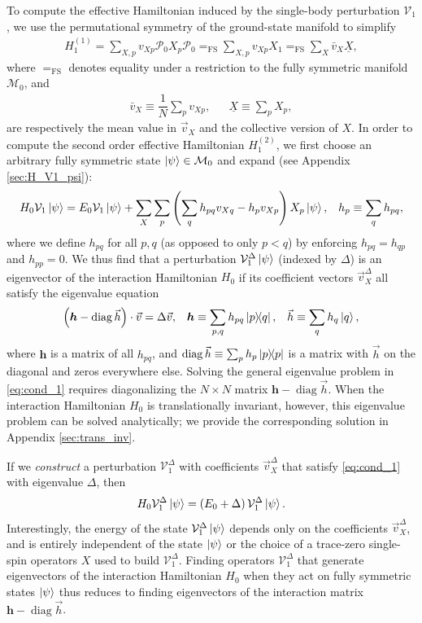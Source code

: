 \documentclass[nofootinbib,notitlepage,11pt]{revtex4-2}
\newcommand{\f}[2]{\dfrac{#1}{#2}} %
\newcommand{\p}[1]{\left(#1\right)} %
\renewcommand{\c}{\cdot} %
\newcommand{\m}{\bm} %
\renewcommand{\v}{\vec} %
\newcommand{\1}{\mathds{1}}
\newcommand{\M}{\mathcal{M}}
\renewcommand{\P}{\mathcal{P}}
\newcommand{\V}{\mathcal{V}}
\newcommand{\EQFS}{=_{\text{FS}}}
\newcommand{\col}{\underline}
\DeclareMathOperator{\diag}{diag}
\begin{document}
To compute the effective Hamiltonian induced by the single-body
perturbation $\V_1$, we use the permutational symmetry of the
ground-state manifold to simplify
\begin{align}
  H_1^{(1)} = \sum_{X,p} v_{Xp} \P_0 X_p \P_0
  \EQFS \sum_{X,p} v_{Xp} X_1
  \EQFS \sum_X \bar v_X \col{X},
  \label{eq:H_1_1}
\end{align}
where $\EQFS$ denotes equality under a restriction to the fully
symmetric manifold $\M_0$, and
\begin{align}
  \bar v_X \equiv \f1N \sum_p v_{Xp},
  &&
  \col{X} \equiv \sum_p X_p,
\end{align}
are respectively the mean value in $\v v_X$ and the collective version
of $X$.  In order to compute the second order effective Hamiltonian
$H_1^{(2)}$, we first choose an arbitrary fully symmetric state
$\ket\psi\in\M_0$ and expand (see Appendix \ref{sec:H_V1_psi}):
\begin{align}
  H_0 \V_1 \ket\psi
  = E_0 \V_1 \ket\psi
  + \sum_X \sum_p \p{\sum_q h_{pq} v_{Xq} - h_p v_{Xp}} X_p
  \ket\psi,
  &&
  h_p \equiv \sum_q h_{pq},
  \label{eq:H_V1_psi}
\end{align}
where we define $h_{pq}$ for all $p,q$ (as opposed to only $p<q$) by
enforcing $h_{pq}=h_{qp}$ and $h_{pp}=0$.  We thus find that a
perturbation $\V_1^\Delta\ket\psi$ (indexed by $\Delta$) is an
eigenvector of the interaction Hamiltonian $H_0$ if its coefficient
vectors $\v v_X^\Delta$ all satisfy the eigenvalue equation
\begin{align}
  \p{\m h - \diag\v h}\c\v v = \Delta \v v,
  &&
  \m h \equiv \sum_{p,q} h_{pq} \op{p}{q},
  &&
  \v h \equiv \sum_q h_q \ket{q},
  \label{eq:cond_1}
\end{align}
where $\m h$ is a matrix of all $h_{pq}$, and
$\diag\v h\equiv\sum_p h_p \op{p}$ is a matrix with $\v h$ on the
diagonal and zeros everywhere else.  Solving the general eigenvalue
problem in \eqref{eq:cond_1} requires diagonalizing the $N\times N$
matrix $\m h-\diag\v h$.  When the interaction Hamiltonian $H_0$ is
translationally invariant, however, this eigenvalue problem can be
solved analytically; we provide the corresponding solution in Appendix
\ref{sec:trans_inv}.

If we {\it construct} a perturbation $\V_1^\Delta$ with coefficients
$\v v_X^\Delta$ that satisfy \eqref{eq:cond_1} with eigenvalue
$\Delta$, then
\begin{align}
  H_0 \V_1^\Delta \ket\psi = \p{E_0 + \Delta} \V_1^\Delta \ket\psi.
\end{align}
Interestingly, the energy of the state $\V_1^\Delta\ket\psi$ depends
only on the coefficients $\v v_X^\Delta$, and is entirely independent
of the state $\ket\psi$ or the choice of a trace-zero single-spin
operators $X$ used to build $\V_1^\Delta$.  Finding operators
$\V_1^\Delta$ that generate eigenvectors of the interaction
Hamiltonian $H_0$ when they act on fully symmetric states $\ket\psi$
thus reduces to finding eigenvectors of the interaction matrix
$\m h-\diag\v h$.
\end{document}
